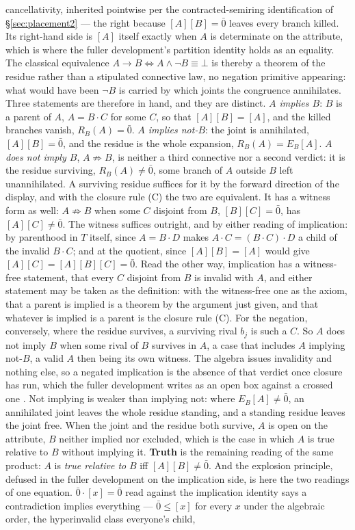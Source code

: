 cancellativity, inherited pointwise per the contracted-semiring identification of \S\ref{sec:placement2} --- the right because $[A][B] = \bar{0}$ leaves every branch killed. Its right-hand side is $[A]$ itself exactly when $A$ is determinate on the attribute, which is where the fuller development's partition identity holds as an equality. The classical equivalence $A \to B \iff A \wedge \lnot B \equiv \bot$ is thereby a theorem of the residue rather than a stipulated connective law, no negation primitive appearing: what would have been $\lnot B$ is carried by which joints the congruence annihilates. Three statements are therefore in hand, and they are distinct. \emph{$A$ implies $B$}: $B$ is a parent of $A$, $A = B \cdot C$ for some $C$, so that $[A][B] = [A]$, and the killed branches vanish, $R_B(A) = \bar{0}$. \emph{$A$ implies not-$B$}: the joint is annihilated, $[A][B] = \bar{0}$, and the residue is the whole expansion, $R_B(A) = E_B[A]$. \emph{$A$ does not imply $B$}, $A \not\Rightarrow B$, is neither a third connective nor a second verdict: it is the residue surviving, $R_B(A) \neq \bar{0}$, some branch of $A$ outside $B$ left unannihilated. A surviving residue suffices for it by the forward direction of the display, and with the closure rule (C) the two are equivalent. It has a witness form as well: $A \not\Rightarrow B$ when some $C$ disjoint from $B$, $[B][C] = \bar{0}$, has $[A][C] \neq \bar{0}$. The witness suffices outright, and by either reading of implication: by parenthood in $T$ itself, since $A = B \cdot D$ makes $A \cdot C = (B \cdot C) \cdot D$ a child of the invalid $B \cdot C$; and at the quotient, since $[A][B] = [A]$ would give $[A][C] = [A][B][C] = \bar{0}$. Read the other way, implication has a witness-free statement, that every $C$ disjoint from $B$ is invalid with $A$, and either statement may be taken as the definition: with the witness-free one as the axiom, that a parent is implied is a theorem by the argument just given, and that whatever is implied is a parent is the closure rule (C). For the negation, conversely, where the residue survives, a surviving rival $b_j$ is such a $C$. So $A$ does not imply $B$ when some rival of $B$ survives in $A$, a case that includes $A$ implying not-$B$, a valid $A$ then being its own witness. The algebra issues invalidity and nothing else, so a negated implication is the absence of that verdict once closure has run, which the fuller development writes as an open box against a crossed one \cite{Aethus}. Not implying is weaker than implying not: where $E_B[A] \neq \bar{0}$, an annihilated joint leaves the whole residue standing, and a standing residue leaves the joint free. When the joint and the residue both survive, $A$ is open on the attribute, $B$ neither implied nor excluded, which is the case in which $A$ is true relative to $B$ without implying it. \textbf{Truth} is the remaining reading of the same product: $A$ is \emph{true relative to} $B$ iff $[A][B] \neq \bar{0}$. And the explosion principle, defused in the fuller development on the implication side, is here the two readings of one equation. $\bar{0}\cdot[x] = \bar{0}$ read against the implication identity says a contradiction implies everything --- $\bar{0} \leq [x]$ for every $x$ under the algebraic order, the hyperinvalid class everyone's child, 